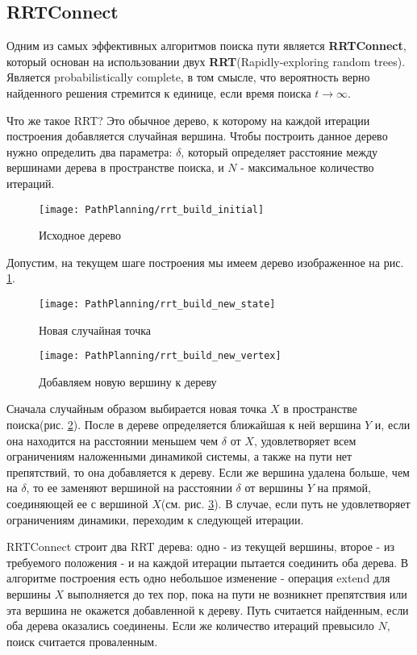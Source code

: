 \subsection{RRTConnect} \label{subsect4_2_3}
Одним из самых эффективных алгоритмов поиска пути является \textbf{RRTConnect}, который основан на использовании двух \textbf{RRT}(Rapidly-exploring random trees)\cite{RRTWiki}. Является probabilistically complete, в том смысле, что вероятность верно найденного решения стремится к единице, если время поиска $t \rightarrow \infty$.

Что же такое RRT? Это обычное дерево, к которому на каждой итерации построения добавляется случайная вершина. Чтобы построить данное дерево нужно определить два параметра: $\delta$, который определяет расстояние между вершинами дерева в пространстве поиска, и $N$ - максимальное количество итераций.
\begin{figure}[ht]
	\centering
	\texttt{[image: PathPlanning/rrt\_build\_initial]}
	\caption{Исходное дерево}
	\label{fig:rrt_build_initial}
\end{figure}
Допустим, на текущем шаге построения мы имеем дерево изображенное на рис. \ref{fig:rrt_build_initial}. 

\begin{figure}[ht]
	\centering
	\texttt{[image: PathPlanning/rrt\_build\_new\_state]}
	\caption{Новая случайная точка}
	\label{fig:rrt_build_new_state}
\end{figure}

\begin{figure}[ht]
	\centering
	\texttt{[image: PathPlanning/rrt\_build\_new\_vertex]}
	\caption{Добавляем новую вершину к дереву}
	\label{fig:rrt_new_vertex}
\end{figure}

Сначала случайным образом выбирается новая точка $X$ в пространстве поиска(рис. \ref{fig:rrt_build_new_state}). После в дереве определяется ближайшая к ней вершина $Y$ и, если она находится на расстоянии меньшем чем $\delta$ от $X$, удовлетворяет всем ограничениям наложенными динамикой системы, а также на пути нет препятствий, то она добавляется к дереву. Если же вершина удалена больше, чем на $\delta$, то ее заменяют вершиной на расстоянии $\delta$ от вершины $Y$ на прямой, соединяющей ее с вершиной $X$(см. рис. \ref{fig:rrt_new_vertex}). В случае, если путь не удовлетворяет ограничениям динамики, переходим к следующей итерации. 

RRTConnect строит два RRT дерева: одно - из текущей вершины, второе - из требуемого положения - и на каждой итерации пытается соединить оба дерева. В алгоритме построения есть одно небольшое изменение - операция extend для вершины $X$ выполняется до тех пор, пока на пути не возникнет препятствия или эта вершина не окажется добавленной к дереву. Путь считается найденным, если оба дерева оказались соединены. Если же количество итераций превысило $N$, поиск считается проваленным.\cite{RRTConnect}

